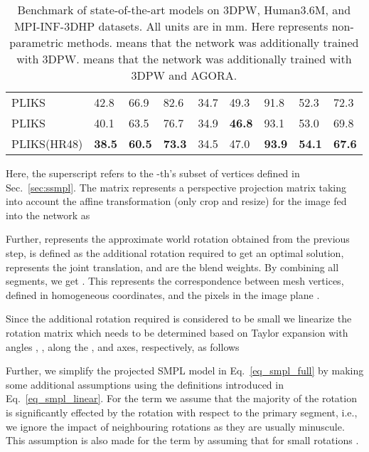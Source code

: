 \documentclass[10pt,twocolumn,letterpaper]{article}
\newcommand{\myrowcolour}{\rowcolor[gray]{0.925}}
\begin{document}
\begin{table*}[ht]
\begin{tabular}{l|llllllll}
PLIKS&
  42.8 &
  66.9 &
  \multicolumn{1}{l|}{82.6} &
  34.7 &
  \multicolumn{1}{l|}{49.3} &
  91.8 & 52.3 &
  72.3 \\ \myrowcolour 
  
PLIKS&
  {40.1} &
  {63.5} &
  \multicolumn{1}{l|}{{76.7}} &
  34.9 &
  \multicolumn{1}{l|}{\textbf{46.8}} &
  {93.1} & {53.0} &
  {69.8} \\ 
  
   PLIKS(HR48)&
   \textbf{38.5} &
   \textbf{60.5} &
   \multicolumn{1}{l|}{\textbf{73.3}} &
   34.5 &
   \multicolumn{1}{l|}{{47.0}} &
   \textbf{93.9} & \textbf{54.1} &
   \textbf{67.6} \\ 
  \hline

 \end{tabular}\caption{\label{tab:main} Benchmark of state-of-the-art models on 3DPW, Human3.6M, and MPI-INF-3DHP datasets. All units are in mm. Here  represents non-parametric methods.  means that the network was additionally trained with 3DPW.  means that the network was additionally trained with 3DPW and AGORA.
}
\end{table*}



Here, the superscript  refers to the -th's subset of vertices defined in Sec.~\ref{sec:ssmpl}. The matrix   represents a perspective projection matrix taking into account the affine transformation (only crop and resize) for the image fed into the network as 






 Further,  represents the approximate world rotation obtained from the previous step,   is defined as the additional rotation required to get an optimal solution,  represents the joint translation, and  are the blend weights. By combining all segments, we get . This represents the correspondence between mesh vertices, defined in homogeneous coordinates, and the pixels in the image plane . 
 
 Since the additional rotation required is considered to be small we linearize the rotation matrix which needs to be determined based on Taylor expansion with angles , ,  along the ,  and  axes, respectively,  as follows 
 
 
 Further, we simplify the projected SMPL model in Eq.~\eqref{eq_smpl_full} by making some additional assumptions using the definitions introduced in Eq.~\eqref{eq_smpl_linear}. For the  term we assume that the majority of the rotation is significantly effected by the rotation with respect to the primary segment, i.e., we ignore the impact of neighbouring rotations as they are usually minuscule. This assumption is also made for the term  by assuming that for small rotations . 
\end{document}
